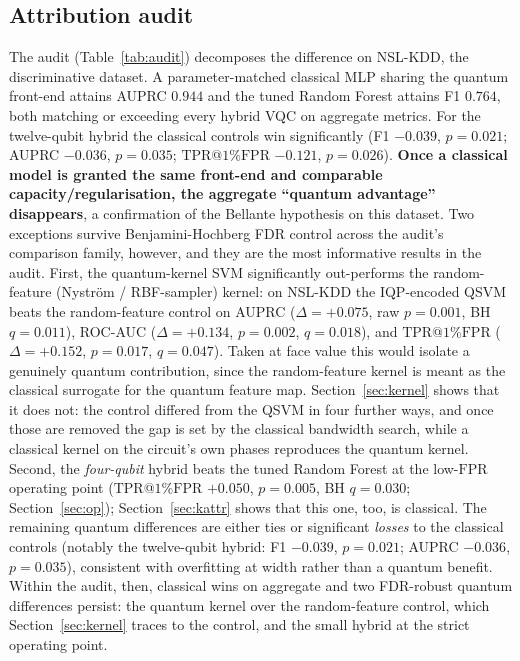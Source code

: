 \documentclass[preprint,11pt]{elsarticle}
\newcommand{\tpr}{\mathrm{TPR}}
\newcommand{\fpr}{\mathrm{FPR}}
\begin{document}
\subsection{Attribution audit}\label{sec:audit-results}
The audit (Table~\ref{tab:audit}) decomposes the difference on NSL-KDD, the discriminative dataset. A
parameter-matched classical MLP sharing the quantum front-end attains AUPRC $0.944$ and the tuned Random
Forest attains F1 $0.764$, both matching or exceeding every hybrid VQC on aggregate metrics. For the
twelve-qubit hybrid the classical controls win significantly (F1 $-0.039$, $p=0.021$; AUPRC $-0.036$,
$p=0.035$; $\tpr$@$1\%\fpr$ $-0.121$, $p=0.026$). \textbf{Once a classical model is granted the same
front-end and comparable capacity/regularisation, the aggregate ``quantum advantage'' disappears}, a
confirmation of the Bellante hypothesis on this dataset. Two exceptions survive
Benjamini-Hochberg FDR control across the audit's comparison family, however, and they are the most
informative results in the audit. First, the quantum-kernel SVM significantly
out-performs the random-feature (Nystr\"om / RBF-sampler) kernel: on
NSL-KDD the IQP-encoded QSVM beats the random-feature control on AUPRC ($\Delta=+0.075$, raw $p=0.001$,
BH $q=0.011$), ROC-AUC ($\Delta=+0.134$, $p=0.002$, $q=0.018$), and $\tpr$@$1\%\fpr$ ($\Delta=+0.152$,
$p=0.017$, $q=0.047$). Taken at face value this would isolate a genuinely quantum contribution, since
the random-feature kernel is meant as the classical surrogate for the quantum feature map.
Section~\ref{sec:kernel} shows that it does not: the control differed from the QSVM in four further
ways, and once those are removed the gap is set by the classical bandwidth search, while a classical
kernel on the circuit's own phases reproduces the quantum kernel.
Second, the \emph{four-qubit} hybrid beats the tuned Random Forest at the low-$\fpr$ operating point
($\tpr$@$1\%\fpr$ $+0.050$, $p=0.005$, BH $q=0.030$; Section~\ref{sec:op}); Section~\ref{sec:kattr}
shows that this one, too, is classical. The remaining quantum
differences are either ties or significant \emph{losses} to the classical controls (notably the
twelve-qubit hybrid: F1 $-0.039$, $p=0.021$; AUPRC $-0.036$, $p=0.035$), consistent with overfitting at
width rather than a quantum benefit. Within the audit, then, classical wins on aggregate and two
FDR-robust quantum differences persist: the quantum kernel over the random-feature control, which
Section~\ref{sec:kernel} traces to the control, and the small hybrid at the strict operating point.
\end{document}
